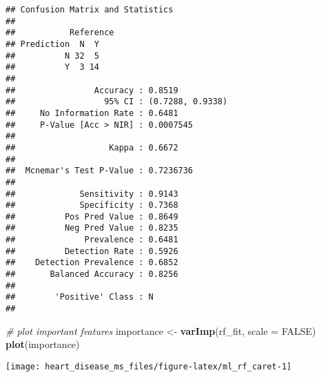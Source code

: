 \documentclass[
]{article}
\newenvironment{Shaded}{\begin{snugshade}}{\end{snugshade}}
\newcommand{\AttributeTok}[1]{\textcolor[rgb]{0.13,0.29,0.53}{#1}}
\newcommand{\CommentTok}[1]{\textcolor[rgb]{0.56,0.35,0.01}{\textit{#1}}}
\newcommand{\ConstantTok}[1]{\textcolor[rgb]{0.56,0.35,0.01}{#1}}
\newcommand{\FunctionTok}[1]{\textcolor[rgb]{0.13,0.29,0.53}{\textbf{#1}}}
\newcommand{\NormalTok}[1]{#1}
\newcommand{\OtherTok}[1]{\textcolor[rgb]{0.56,0.35,0.01}{#1}}
\newcommand{\SpecialCharTok}[1]{\textcolor[rgb]{0.81,0.36,0.00}{\textbf{#1}}}
\begin{document}
\begin{Shaded}
\end{Shaded}

\begin{verbatim}
## Confusion Matrix and Statistics
## 
##           Reference
## Prediction  N  Y
##          N 32  5
##          Y  3 14
##                                           
##                Accuracy : 0.8519          
##                  95% CI : (0.7288, 0.9338)
##     No Information Rate : 0.6481          
##     P-Value [Acc > NIR] : 0.0007545       
##                                           
##                   Kappa : 0.6672          
##                                           
##  Mcnemar's Test P-Value : 0.7236736       
##                                           
##             Sensitivity : 0.9143          
##             Specificity : 0.7368          
##          Pos Pred Value : 0.8649          
##          Neg Pred Value : 0.8235          
##              Prevalence : 0.6481          
##          Detection Rate : 0.5926          
##    Detection Prevalence : 0.6852          
##       Balanced Accuracy : 0.8256          
##                                           
##        'Positive' Class : N               
## 
\end{verbatim}

\begin{Shaded}
\begin{Highlighting}[]
\CommentTok{\# plot important features}
\NormalTok{importance }\OtherTok{\textless{}{-}} \FunctionTok{varImp}\NormalTok{(rf\_fit, }\AttributeTok{scale =} \ConstantTok{FALSE}\NormalTok{)}
\FunctionTok{plot}\NormalTok{(importance)}
\end{Highlighting}
\end{Shaded}

\begin{center}\texttt{[image: heart\_disease\_ms\_files/figure-latex/ml\_rf\_caret-1]} \end{center}
\end{document}
